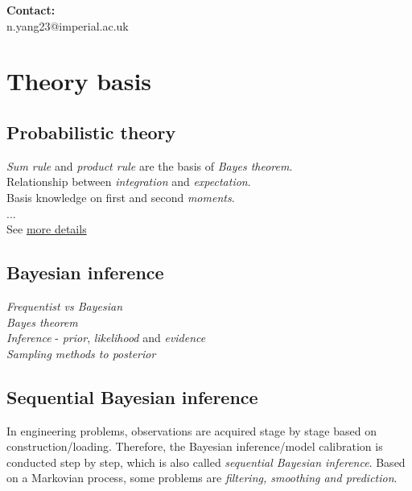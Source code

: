 \documentclass{ol-softwaremanual}
\begin{document}
\textbf{Contact:}\\
n.yang23@imperial.ac.uk

\section{Theory basis}
\subsection*{Probabilistic theory}
\textit{Sum rule} and \textit{product rule} are the basis of \textit{Bayes theorem}. \\
Relationship between \textit{integration} and \textit{expectation}.\\
Basis knowledge on first and second \textit{moments}.\\
...\\
See \href{https://www.britannica.com/science/probability-theory}{more details}



\subsection*{Bayesian inference}
\textit{Frequentist vs Bayesian} \\
\textit{Bayes theorem} \\
\textit{Inference} - \textit{prior}, \textit{likelihood} and \textit{evidence}\\
\textit{Sampling methods to posterior}





\subsection*{Sequential Bayesian inference}
In engineering problems, observations are acquired stage by stage based on construction/loading. Therefore, the Bayesian inference/model calibration is conducted step by step, which is also called \textit{sequential Bayesian inference}. Based on a Markovian process, some problems are \textit{filtering, smoothing and prediction}.
\end{document}
